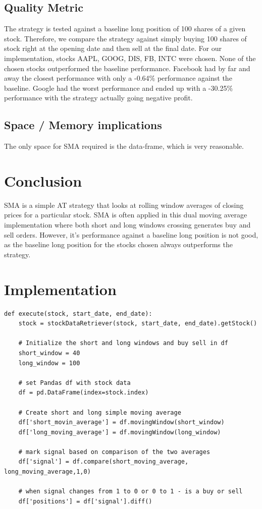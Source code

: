 \documentclass[letterpaper,11pt]{article}
\begin{document}
\subsection*{Quality Metric}
The strategy is tested against a baseline long position of 100 shares of a given stock. Therefore, we compare the strategy against simply buying 100 shares of stock right at the opening date and then sell at the final date. For our implementation, stocks AAPL, GOOG, DIS, FB, INTC were chosen. None of the chosen stocks outperformed the baseline performance. Facebook had by far and away the closest performance with only a -0.64\% performance against the baseline. Google had the worst performance and ended up with a -30.25\% performance with the strategy actually going negative profit.

\subsection*{Space / Memory implications}
The only space for SMA required is the data-frame, which is very reasonable.

\section*{Conclusion}

SMA is a simple AT strategy that looks at rolling window averages of closing prices for a particular stock. SMA is often applied in this dual moving average implementation where both short and long windows crossing generates buy and sell orders. However, it's performance against a baseline long position is not good, as the baseline long position for the stocks chosen always outperforms the strategy. 

\section*{Implementation}
\begin{verbatim}
def execute(stock, start_date, end_date):
    stock = stockDataRetriever(stock, start_date, end_date).getStock()

    # Initialize the short and long windows and buy sell in df
    short_window = 40
    long_window = 100
    
    # set Pandas df with stock data
    df = pd.DataFrame(index=stock.index)

    # Create short and long simple moving average 
    df['short_movin_average'] = df.movingWindow(short_window)
    df['long_moving_average'] = df.movingWindow(long_window)
    
    # mark signal based on comparison of the two averages
    df['signal'] = df.compare(short_moving_average, long_moving_average,1,0)
    
    # when signal changes from 1 to 0 or 0 to 1 - is a buy or sell
    df['positions'] = df['signal'].diff()

\end{verbatim}



\end{document}
